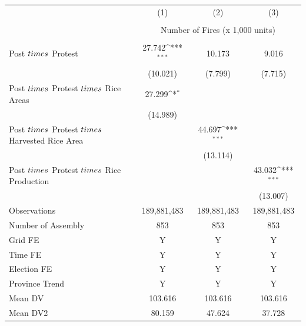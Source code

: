 {\def\sym#1{\ifmmode^{#1}\else\(^{#1}\)\fi}
\begin{tabular}{l*{3}{c}}
\hline
            &\multicolumn{1}{c}{(1)}         &\multicolumn{1}{c}{(2)}         &\multicolumn{1}{c}{(3)}         \\\\
            &\multicolumn{3}{c}{Number of Fires (x 1,000 units)} \\\\ \hline

Post $\\times$ Protest&      27.742\sym{***}&      10.173         &       9.016         \\
            &    (10.021)         &     (7.799)         &     (7.715)         \\
Post $\\times$ Protest $\\times$ Rice Areas&      27.299\sym{*}  &                     &                     \\
            &    (14.989)         &                     &                     \\
Post $\\times$ Protest $\\times$ Harvested Rice Area&                     &      44.697\sym{***}&                     \\
            &                     &    (13.114)         &                     \\
Post $\\times$ Protest $\\times$ Rice Production&                     &                     &      43.032\sym{***}\\
            &                     &                     &    (13.007)         \\
\hline
Observations& 189,881,483         & 189,881,483         & 189,881,483         \\
Number of Assembly&         853         &         853         &         853         \\
Grid FE     &           Y         &           Y         &           Y         \\
Time FE     &           Y         &           Y         &           Y         \\
Election FE &           Y         &           Y         &           Y         \\
Province Trend&           Y         &           Y         &           Y         \\
Mean DV     &     103.616         &     103.616         &     103.616         \\
Mean DV2    &      80.159         &      47.624         &      37.728         \\
\hline
\end{tabular}
}
